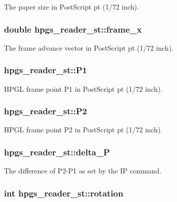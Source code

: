 The paper size in PostScript pt (1/72 inch). 
\subsubsection[frame\_\-x]{\setlength{\rightskip}{0pt plus 5cm}double {\bf hpgs\_\-reader\_\-st::frame\_\-x}}\label{structhpgs__reader__st_9b94337c22f1c37b911af05cae026bd3}


The frame advance vector in PostScript pt (1/72 inch). 
\subsubsection[P1]{ {\bf hpgs\_\-reader\_\-st::P1}}\label{structhpgs__reader__st_ee7c95228a9ca69f97bebf9f05323ae1}


HPGL frame point P1 in PostScript pt (1/72 inch). 
\subsubsection[P2]{ {\bf hpgs\_\-reader\_\-st::P2}}\label{structhpgs__reader__st_202ca8d57bb648548e2d7734271cc055}


HPGL frame point P2 in PostScript pt (1/72 inch). 
\subsubsection[delta\_\-P]{ {\bf hpgs\_\-reader\_\-st::delta\_\-P}}\label{structhpgs__reader__st_46a3367b70f96e3b9d33750ac3b964f9}


The difference of P2-P1 as set by the IP command. 
\subsubsection[rotation]{\setlength{\rightskip}{0pt plus 5cm}int {\bf hpgs\_\-reader\_\-st::rotation}}\label{structhpgs__reader__st_8573cfba08ff02a7f2ff3b8bd290b291}


